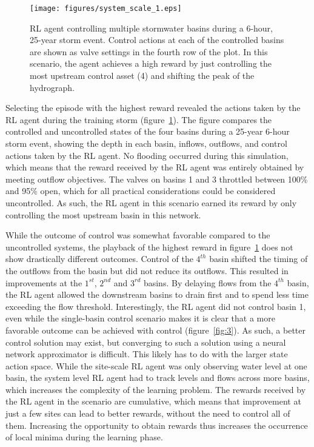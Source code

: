 \begin{figure}[H]
    \centering
        \texttt{[image: figures/system\_scale\_1.eps]}
    \caption{RL agent controlling multiple stormwater basins during a 6-hour, 25-year storm event. Control actions at each of the controlled basins are shown as valve settings in the fourth row of the plot. In this scenario, the agent achieves a high reward by just controlling the most upstream control asset (4) and shifting the peak of the hydrograph. }
    \label{fig:5}
\end{figure}

Selecting the episode with the highest reward revealed the actions taken by the RL agent during the training storm (figure~\ref{fig:5}).
The figure compares the controlled and uncontrolled states of the four basins during a 25-year 6-hour storm event, showing the depth in each basin, inflows, outflows, and control actions taken by the RL agent.
No flooding occurred during this simulation, which means that the reward received by the RL agent was entirely obtained by meeting outflow objectives.
The valves on basins 1 and 3 throttled between 100\% and 95\% open, which for all practical considerations could be considered uncontrolled.
As such, the RL agent in this scenario earned its reward by only controlling the most upstream basin in this network.

While the outcome of control was somewhat favorable compared to the uncontrolled systems, the playback of the highest reward in figure~\ref{fig:5} does not show drastically different outcomes.
Control of the $4^{th}$ basin shifted the timing of the outflows from the basin but did not reduce its outflows.
This resulted in improvements at the $1^{st}$, $2^{nd}$ and $3^{rd}$ basins.
By delaying flows from the $4^{th}$ basin, the RL agent allowed the downstream basins to drain first and to spend less time exceeding the flow threshold.
Interestingly, the RL agent did not control basin 1, even while the single-basin control scenario makes it is clear that a more favorable outcome can be achieved with control (figure~\ref{fig:3}).
As such, a better control solution may exist, but converging to such a solution using a neural network approximator is difficult.
This likely has to do with the larger state action space.
While the site-scale RL agent was only observing water level at one basin, the system level RL agent had to track levels and flows across more basins, which increases the complexity of the learning problem.
The rewards received by the RL agent in the scenario are cumulative, which means that improvement at just a few sites can lead to better rewards, without the need to control all of them.
Increasing the opportunity to obtain rewards thus increases the occurrence of local minima during the learning phase.

